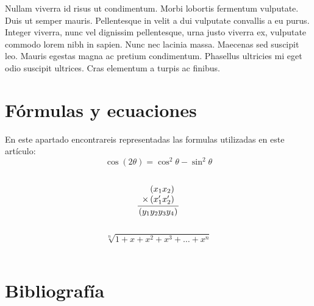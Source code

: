 \documentclass[a4paper,11pt]{article}
\begin{document}
Nullam viverra id risus ut condimentum. Morbi lobortis fermentum vulputate. Duis ut semper mauris. Pellentesque in velit a dui vulputate convallis a eu purus. Integer viverra, nunc vel dignissim pellentesque, urna justo viverra ex, vulputate commodo lorem nibh in sapien. Nunc nec lacinia massa. Maecenas sed suscipit leo. Mauris \cite{Bib02} egestas magna ac pretium condimentum. Phasellus ultricies mi eget odio suscipit ultrices. Cras elementum a turpis ac finibus.

\part{Fórmulas y ecuaciones}
En este apartado encontrareis representadas las formulas utilizadas en  este artículo:\\
\begin{displaymath}
\cos (2\theta) = \cos^2 \theta - \sin^2 \theta
\end{displaymath}\\
\begin{equation}
\frac{
	\begin{array}[b]{r}
	\left( x_1 x_2 \right)\\
	\times \left( x'_1 x'_2 \right)
	\end{array}
}{
	\left( y_1y_2y_3y_4 \right)
}
\end{equation}\\
\begin{displaymath}
\sqrt[n]{1+x+x^2+x^3+\dots+x^n}
\end{displaymath}\\

\part{Bibliografía}


\end{document}

